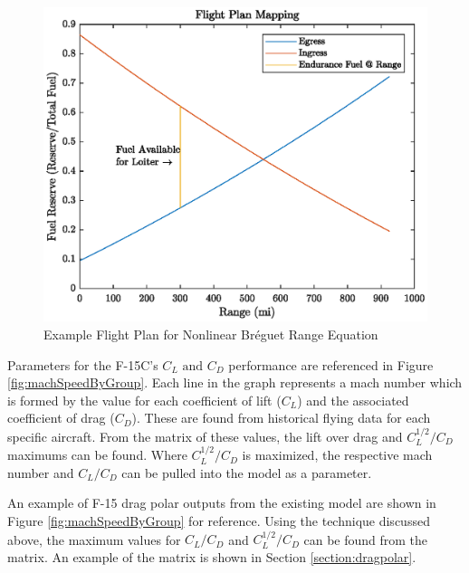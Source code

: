 \begin{figure}[H]
    \centering
    \includegraphics{Thesis/Method/NLFlightPlanT37.eps}
    \caption{Example Flight Plan for Nonlinear Br\'eguet Range Equation}
    \label{fig:NLFlightPlanT37}
\end{figure}
\par
Parameters for the F-15C's $C_L\text{ and }C_D$ performance are referenced in Figure \ref{fig:machSpeedByGroup}. Each line in the graph represents a mach number which is formed by the value for each coefficient of lift ($C_L$) and the associated coefficient of drag ($C_D$). These are found from historical flying data for each specific aircraft. From the matrix of these values, the lift over drag and $C_L^{1/2}/C_D$ maximums can be found. Where $C_L^{1/2}/C_D$ is maximized, the respective mach number and $C_L/C_D$ can be pulled into the model as a parameter.\par
An example of F-15 drag polar outputs from the existing model are shown in Figure \ref{fig:machSpeedByGroup} for reference. Using the technique discussed above, the maximum values for $C_L/C_D$ and $C_L^{1/2}/C_D$ can be found from the matrix. An example of the matrix is shown in Section \ref{section:dragpolar}.

